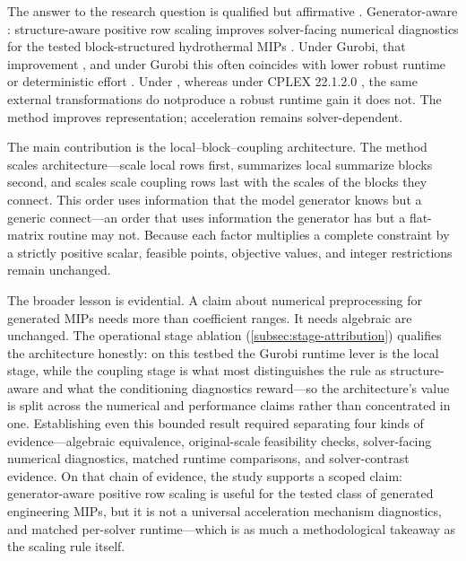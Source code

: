 \documentclass[AMA,Times1COL]{WileyNJDv5} %
\providecommand{\DIFadd}[1]{{\protect\color{blue} \sf #1}} %
\providecommand{\DIFdel}[1]{{\protect\color{red} \scriptsize #1}} %
\providecommand{\DIFaddbegin}{} %
\providecommand{\DIFaddend}{} %
\providecommand{\DIFdelbegin}{} %
\providecommand{\DIFdelend}{} %
\begin{document}
The answer to the research question is qualified but affirmative\DIFdelbegin \DIFdel{. Generator-aware }\DIFdelend \DIFaddbegin \DIFadd{: structure-aware }\DIFaddend positive row
scaling improves solver-facing numerical diagnostics for the tested block-structured hydrothermal
MIPs\DIFdelbegin \DIFdel{. Under Gurobi, that improvement }\DIFdelend \DIFaddbegin \DIFadd{, and under Gurobi this }\DIFaddend often coincides with lower robust runtime or deterministic effort\DIFdelbegin \DIFdel{. Under }\DIFdelend \DIFaddbegin \DIFadd{,
whereas under }\DIFaddend CPLEX 22.1.2.0 \DIFdelbegin \DIFdel{, the same external transformations do notproduce a robust runtime gain}\DIFdelend \DIFaddbegin \DIFadd{it does not}\DIFaddend . The method improves representation; acceleration remains
solver-dependent.

The main contribution is the local--block--coupling \DIFdelbegin \DIFdel{architecture. The method scales }\DIFdelend \DIFaddbegin \DIFadd{architecture---scale }\DIFaddend local rows first,
\DIFdelbegin \DIFdel{summarizes local }\DIFdelend \DIFaddbegin \DIFadd{summarize }\DIFaddend blocks second, \DIFdelbegin \DIFdel{and scales }\DIFdelend \DIFaddbegin \DIFadd{scale }\DIFaddend coupling rows last with the scales of the blocks they \DIFdelbegin \DIFdel{connect. This order uses information that the model generator knows but a generic }\DIFdelend \DIFaddbegin \DIFadd{connect---an
order that uses information the generator has but a }\DIFaddend flat-matrix routine may not. Because each
factor multiplies a complete constraint by a strictly positive scalar, feasible points, objective
values, and integer restrictions \DIFdelbegin \DIFdel{remain unchanged. }%

\DIFdel{The broader lesson is evidential. A claim about numerical preprocessing for generated MIPs
needs more than
coefficient ranges. It needs algebraic }\DIFdelend \DIFaddbegin \DIFadd{are unchanged. The operational stage ablation
(\cref{subsec:stage-attribution}) qualifies the architecture honestly: on this testbed the
Gurobi runtime lever is the local stage, while the coupling stage is what most distinguishes
the rule as structure-aware and what the conditioning diagnostics reward---so the
architecture's value is split across the numerical and performance claims rather than
concentrated in one. Establishing even this bounded result required
separating four kinds of evidence---algebraic }\DIFaddend equivalence, original-scale feasibility\DIFdelbegin \DIFdel{checks}\DIFdelend , solver-facing
\DIFdelbegin \DIFdel{numerical diagnostics, matched runtime comparisons, and solver-contrast evidence. On that chain of evidence, the study supports a scoped claim:
generator-aware positive row scaling is useful for the tested class of generated
engineering MIPs, but it is not a universal acceleration mechanism}\DIFdelend \DIFaddbegin \DIFadd{diagnostics, and matched per-solver runtime---which is as much a methodological takeaway as the
scaling rule itself}\DIFaddend .
\end{document}
